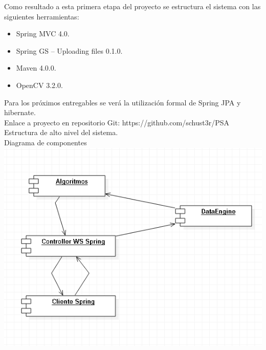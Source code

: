 \documentclass{report}
\begin{document}
Como resultado a esta primera etapa del proyecto se estructura el sistema con las siguientes herramientas: 
\begin{itemize}
\item Spring MVC 4.0. 
\item Spring GS – Uploading files 0.1.0. 
\item Maven 4.0.0. 
\item OpenCV 3.2.0. 
\end{itemize}

Para los pr\'oximos entregables se ver\'a la utilizaci\'on formal de Spring JPA y hibernate. \\
Enlace a proyecto en repositorio Git:  https://github.com/schust3r/PSA \\ [0.5 cm]

\huge  Estructura de alto nivel del sistema.\\

\LARGE 
Diagrama de componentes \\[0.5 cm]

\includegraphics [scale = 1]{Diagrama.png}\\ [0.5 cm] 
\end{document}
